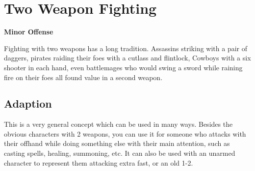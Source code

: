 \section{Two Weapon Fighting}
\textbf{Minor Offense}

Fighting with two weapons has a long tradition. Assassins striking with a pair of daggers, pirates raiding their foes with a cutlass and flintlock, Cowboys with a six shooter in each hand, even battlemages who would swing a sword while raining fire on their foes all found value in a second weapon. 

\subsection*{Adaption}
This is a very general concept which can be used in many ways. Besides the obvious characters with 2 weapons, you can use it for someone who attacks with their offhand while doing something else with their main attention, such as casting spells, healing, summoning, etc. It can also be used with an unarmed character to represent them attacking extra fast, or an old 1-2. 
